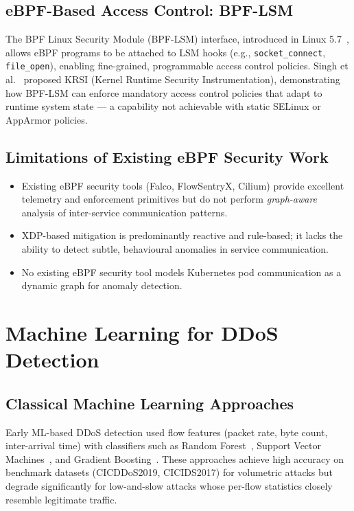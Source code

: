 \subsection{eBPF-Based Access Control: BPF-LSM}

The BPF Linux Security Module (BPF-LSM) interface, introduced in Linux 5.7~\cite{bpflsm},
allows eBPF programs to be attached to LSM hooks (e.g., \texttt{socket\_connect},
\texttt{file\_open}), enabling fine-grained, programmable access control policies.
Singh et al.~\cite{singh2019krsi} proposed KRSI (Kernel Runtime Security
Instrumentation), demonstrating how BPF-LSM can enforce mandatory access control
policies that adapt to runtime system state — a capability not achievable with static
SELinux or AppArmor policies.

\subsection{Limitations of Existing eBPF Security Work}

\begin{itemize}
  \item Existing eBPF security tools (Falco, FlowSentryX, Cilium) provide excellent
  telemetry and enforcement primitives but do not perform \emph{graph-aware} analysis of
  inter-service communication patterns.
  \item XDP-based mitigation is predominantly reactive and rule-based; it lacks the
  ability to detect subtle, behavioural anomalies in service communication.
  \item No existing eBPF security tool models Kubernetes pod communication as a dynamic
  graph for anomaly detection.
\end{itemize}

\section{Machine Learning for DDoS Detection}
\label{sec:lit_ml_ddos}

\subsection{Classical Machine Learning Approaches}

Early ML-based DDoS detection used flow features (packet rate, byte count, inter-arrival
time) with classifiers such as Random Forest~\cite{rf_ddos}, Support Vector
Machines~\cite{svm_ddos}, and Gradient Boosting~\cite{xgboost_ids}. These approaches
achieve high accuracy on benchmark datasets (CICDDoS2019, CICIDS2017) for volumetric
attacks but degrade significantly for low-and-slow attacks whose per-flow statistics
closely resemble legitimate traffic.

